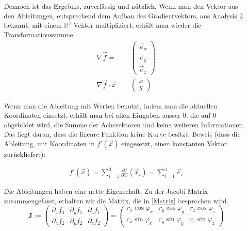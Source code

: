 \documentclass[a4paper]{article}
\begin{document}
Dennoch ist das Ergebnis, zuverl\"assig und n\"utzlich. Wenn man den Vektor aus den Ableitungen, entsprechend dem Aufbau des Gradientvektors, aus Analysis 2 bekannt, mit einem $\mathbb{R}^{3}$-Vektor multipliziert, erh\"alt
man wieder die Transformationssumme.\\

\begin{displaymath}
\begin{align}
\nabla\vec{f} =& \begin{pmatrix}\vec{e}_{x}\\\vec{e}_{y}\\\vec{e}_{z}\end{pmatrix}\\
\nabla\vec{f}\cdot\vec{x} =& \begin{pmatrix}x\\y\end{pmatrix}
\end{align}
\end{displaymath}

Wenn man die Ableitung mit Werten benutzt, indem man die aktuellen Koordinaten einsetzt, erh\"alt man bei allen Eingaben ausser 0, die auf 0 abgebildet wird, die Summe der Achsvektoren und keine weiteren Informationen. Das liegt daran, dass die lineare Funktion keine Kurve besitzt. 
Beweis (dass die Ableitung, mit Koordinaten in $f'(\vec{x})$ eingesetzt, einen konstanten Vektor zur\"uckliefert):

\begin{displaymath}
\begin{align}
f'(\vec{x}) = \sum_{i=1}^{3}\frac{\partial f}{\partial x_i}(\vec{x}_i) = \sum_{i=1}^{3}\vec{e}_{i}
\end{align}
\end{displaymath}

Die Ableitungen haben eine nette Eigenschaft. Zu der Jacobi-Matrix zusammengefasst, erhalten wir die Matrix, die in \ref{Matrix} besprochen wird.\\

\begin{displaymath}
\boldsymbol{J} := \begin{pmatrix}
	\partial_x f_{1} & \partial_y f_{1} & \partial_z f_{1}\\
	\partial_x f_{2} & \partial_y f_{2} & \partial_z f_{2}
\end{pmatrix} = \begin{pmatrix}r_x \cos \varphi_x & r_y \cos \varphi_y & r_z \cos \varphi_z\\
r_x \sin \varphi_x & r_y \sin \varphi_y & r_z \sin \varphi_z \end{pmatrix}
\end{displaymath}
\end{document}
